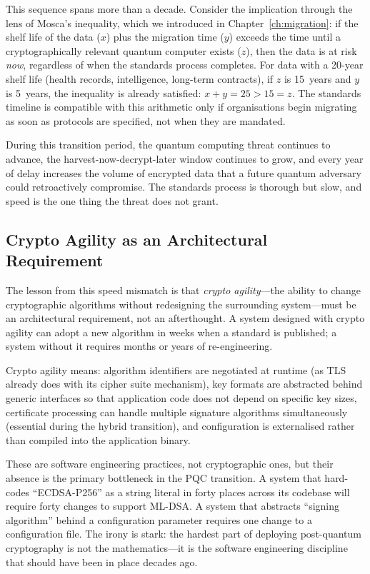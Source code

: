 This sequence spans more than a decade. Consider the implication through the lens of Mosca's inequality, which we introduced in Chapter~\ref{ch:migration}: if the shelf life of the data ($x$) plus the migration time ($y$) exceeds the time until a cryptographically relevant quantum computer exists ($z$), then the data is at risk \emph{now}, regardless of when the standards process completes. For data with a 20-year shelf life (health records, intelligence, long-term contracts), if $z$ is 15~years and $y$ is 5~years, the inequality is already satisfied: $x + y = 25 > 15 = z$. The standards timeline is compatible with this arithmetic only if organisations begin migrating as soon as protocols are specified, not when they are mandated.

During this transition period, the quantum computing threat continues to advance, the harvest-now-decrypt-later window continues to grow, and every year of delay increases the volume of encrypted data that a future quantum adversary could retroactively compromise. The standards process is thorough but slow, and speed is the one thing the threat does not grant.

\subsection{Crypto Agility as an Architectural Requirement}
\label{subsec:crypto-agility}

The lesson from this speed mismatch is that \emph{crypto agility}---the ability to change cryptographic algorithms without redesigning the surrounding system---must be an architectural requirement, not an afterthought. A system designed with crypto agility can adopt a new algorithm in weeks when a standard is published; a system without it requires months or years of re-engineering.

Crypto agility means: algorithm identifiers are negotiated at runtime (as TLS already does with its cipher suite mechanism), key formats are abstracted behind generic interfaces so that application code does not depend on specific key sizes, certificate processing can handle multiple signature algorithms simultaneously (essential during the hybrid transition), and configuration is externalised rather than compiled into the application binary.

These are software engineering practices, not cryptographic ones, but their absence is the primary bottleneck in the PQC transition. A system that hard-codes ``ECDSA-P256'' as a string literal in forty places across its codebase will require forty changes to support ML-DSA. A system that abstracts ``signing algorithm'' behind a configuration parameter requires one change to a configuration file. The irony is stark: the hardest part of deploying post-quantum cryptography is not the mathematics---it is the software engineering discipline that should have been in place decades ago.

